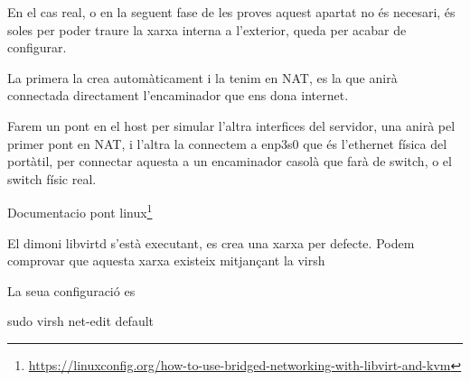 \documentclass[
  10pt,
]{krantz}
\newenvironment{Shaded}{\begin{snugshade}}{\end{snugshade}}
\newcommand{\AttributeTok}[1]{\textcolor[rgb]{0.77,0.63,0.00}{#1}}
\newcommand{\ExtensionTok}[1]{#1}
\newcommand{\FunctionTok}[1]{\textcolor[rgb]{0.00,0.00,0.00}{#1}}
\newcommand{\NormalTok}[1]{#1}
\DeclareRobustCommand{\href}[2]{#2\footnote{\url{#1}}}
\begin{document}
En el cas real, o en la seguent fase de les proves aquest apartat no és necesari, és soles per poder traure la xarxa interna a l'exterior, queda per acabar de configurar.

La primera la crea automàticament i la tenim en NAT, es la que anirà connectada directament l'encaminador que ens dona internet.

Farem un pont en el host per simular l'altra interfices del servidor, una anirà pel primer pont en NAT, i l'altra la connectem a enp3s0 que és l'ethernet física del portàtil, per connectar aquesta a un encaminador casolà que farà de switch, o el switch físic real.

\href{https://linuxconfig.org/how-to-use-bridged-networking-with-libvirt-and-kvm}{Documentacio pont linux}

El dimoni libvirtd s'està executant, es crea una xarxa per defecte. Podem comprovar que aquesta xarxa existeix mitjançant la virsh

\begin{Shaded}
\end{Shaded}

La seua configuració es

\begin{Shaded}
\begin{Highlighting}[]
\FunctionTok{sudo}\NormalTok{ virsh net{-}edit default}
\end{Highlighting}
\end{Shaded}
\end{document}
